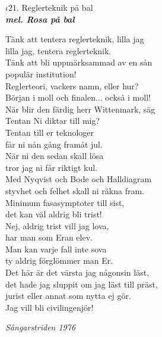 \documentclass[a6paper,10pt]{article}
\newcommand{\mel}[1]{\small\textbf{\textit{mel. #1 \\}}}
\begin{document}
\setlength{\oddsidemargin}{-0.37in}
\noindent
\begin{center}
\Large $\iota21$. Reglerteknik på bal \\
\mel{Rosa på bal}
\end{center}
Tänk att tentera reglerteknik, lilla jag \\
lilla jag, tentera reglerteknik. \\
Tänk att bli uppmärksammad av en sån \\
populär institution!
\vspace{5pt} \\
Reglerteori, vackers namn, eller hur? \\
Början i moll och finalen... också i moll! \\
När blir den färdig herr Wittenmark, säg \\
Tentan Ni diktar till mig?
\vspace{5pt} \\
Tentan till er teknologer \\
får ni nån gång framåt jul. \\
När ni den sedan skall lösa\\
tror jag ni får riktigt kul. \\
Med Nyqvist och Bode och Halldiagram \\
styvhet och felhet skall ni räkna fram.\\
Minimum fasasymptoter till sist, \\
det kan väl aldrig bli trist!
\vspace{5pt} \\
Nej, aldrig trist vill jag lova, \\
har man som Eran elev. \\
Man kan varje fall inte sova \\
ty aldrig förglömmer man Er. \\
Det här är det värsta jag någonsin läst, \\
det hade jag sluppit om jag läst till präst, \\
jurist eller annat som nytta ej gör. \\
Jag vill bli civilingenjör!
\begin{flushright}
\textit{Sångarstriden 1976}
\end{flushright}
\end{document}
